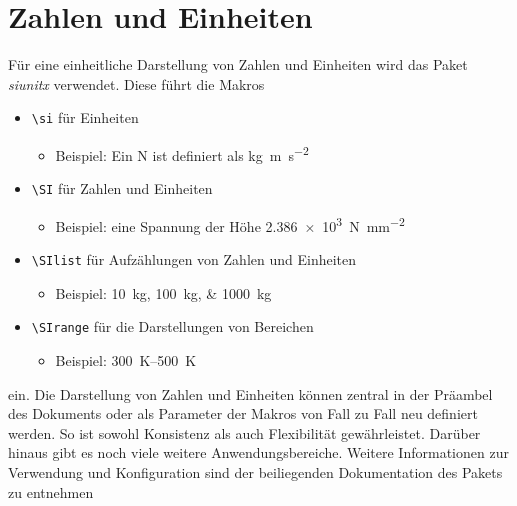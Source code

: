 	\section{Zahlen und Einheiten}
		Für eine einheitliche Darstellung von Zahlen und Einheiten wird das Paket \textit{siunitx} verwendet. Diese führt die Makros
		\begin{itemize}
			\item	\verb|\si| für Einheiten
				\begin{itemize}
					\item	Beispiel: Ein \si{\newton} ist definiert als \si{\kilogram\meter\per\second\squared}
				\end{itemize}
			\item	\verb|\SI| für Zahlen und Einheiten
				\begin{itemize}
					\item	Beispiel: eine Spannung der Höhe \SI{2,386e3}{\newton\per\milli\meter\squared}
				\end{itemize}
			\item	\verb|\SIlist| für Aufzählungen von Zahlen und Einheiten
				\begin{itemize}
					\item	Beispiel: \SIlist{10;100;1000}{\kilogram}
				\end{itemize}
			\item	\verb|\SIrange| für die Darstellungen von Bereichen
				\begin{itemize}
					\item	Beispiel: \SIrange{300}{500}{\kelvin}
				\end{itemize}
		\end{itemize}
		ein. Die Darstellung von Zahlen und Einheiten können zentral in der Präambel des Dokuments oder als Parameter der Makros von Fall zu Fall neu definiert werden. So ist sowohl Konsistenz als auch Flexibilität gewährleistet.\newline
		Darüber hinaus gibt es noch viele weitere Anwendungsbereiche. Weitere Informationen zur Verwendung und Konfiguration sind der beiliegenden Dokumentation des Pakets zu entnehmen